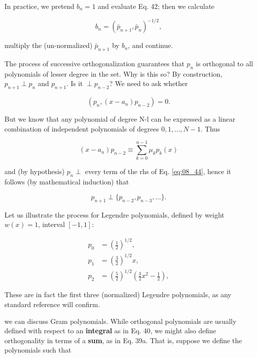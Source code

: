 In practice, we pretend $b_{n}=1$ and evaluate Eq. 42; then we calculate

\begin{equation}
b_{n} = ( \bar{p}_{n+1}, \bar{p}_{n})^{-1/2},
\end{equation}

multiply the (un-normalized) $\bar{p}_{n+1}$ by $b_{n}$, and continue.

The process of successive orthogonalization guarantees that $p_{n}$ is orthogonal to all polynomials of lesser degree in the set. Why is this so? By construction, $p_{n+1} \perp p_{n}$ and $p_{n+1}$. Is it $\perp p_{n-2}$? We need to ask whether

\begin{equation*}
(p_{n}, (x-a_{n})p_{n-2}) = 0.
\end{equation*}

But we know that any polynomial of degree N-l can be expressed as a linear combination of independent polynomials of degrees $0, 1, ... , N-1$. Thus

\begin{equation}\label{eq:08_44}
(x - a_{n}) p_{n-2} \equiv \sum_{k=0}^{n-1} \mu_{k} p_{k}(x)
\end{equation}

and (by hypothesis) $p_{n} \perp$ every term of the rhs of Eq. \ref{eq:08_44}, hence it follows (by mathematical induction) that

\begin{equation*}
p_{n+1} \perp \{ p_{n-2} , p_{n-3} , ... \}.
\end{equation*}

Let us illustrate the process for Legendre polynomials, defined by weight $w(x) = 1$, interval $[-1,1]$:

\begin{align*}
p_{0} & = (\frac{1}{2})^{1/2} , \\
p_{1} & = (\frac{3}{2})^{1/2} x , \\
p_{2} & = (\frac{5}{2})^{1/2} (\frac{3}{2}x^{2} - \frac{1}{2}) ,
\end{align*}

These are in fact the first three (normalized) Legendre polynomials, as any standard reference will confirm.

 we can discuss Gram polynomials. While orthogonal polynomials are usually defined with respect to an \textbf{integral} as in Eq. 40, we might also define orthogonality in terms of a \textbf{sum}, as in Eq. 39a. That is, suppose we define the polynomials such that

